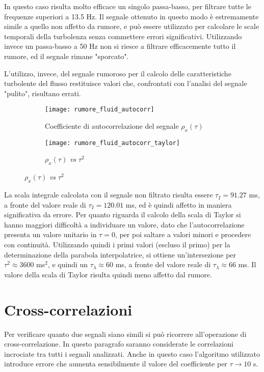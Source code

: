\documentclass{article} %
\begin{document}
In questo caso risulta molto efficace un singolo passa-basso, per filtrare tutte le frequenze superiori a 13.5 Hz. Il segnale ottenuto in questo modo è estremamente simile a quello non affetto da rumore, e può essere utilizzato per calcolare le scale temporali della turbolenza senza commettere errori significativi. Utilizzando invece un passa-basso a 50 Hz non si riesce a filtrare efficacemente tutto il rumore, ed il segnale rimane "sporcato".\par
L'utilizzo, invece, del segnale rumoroso per il calcolo delle caratteristiche turbolente del flusso restituisce valori che, confrontati con l'analisi del segnale "pulito", risultano errati.
\begin{figure}[h!]
	\begin{subfigure}{0.5\textwidth}
		\texttt{[image: rumore\_fluid\_autocorr]}
		\caption{Coefficiente di autocorrelazione del segnale $\rho_{x}(\tau)$}
	\end{subfigure}
	\begin{subfigure}{0.5\textwidth}
		\texttt{[image: rumore\_fluid\_autocorr\_taylor]}
		\caption{$\rho_{x}(\tau)$ \textit{vs} $\tau^2$}
	\end{subfigure}
\end{figure}\par
La scala integrale calcolata con il segnale non filtrato risulta essere $\tau_I = 91.27$ ms, a fronte del valore reale di $\tau_I = 120.01$ ms, ed è quindi affetto in maniera significativa da errore. Per quanto riguarda il calcolo della scala di Taylor si hanno maggiori difficoltà a individuare un valore, dato che l'autocorrelazione presenta un valore unitario in $\tau = 0$, per poi saltare a valori minori e procedere con continuità. Utilizzando quindi i primi valori (escluso il primo) per la determinazione della parabola interpolatrice, si ottiene un'intersezione per $\tau^2 \approx 3600$ ms$^2$, e quindi un $\tau_{\lambda} \approx 60$ ms, a fronte del valore reale di $\tau_{\lambda} \approx 66$ ms. Il valore della scala di Taylor risulta quindi meno affetto dal rumore.

\section{Cross-correlazioni}
Per verificare quanto due segnali siano simili si può ricorrere all'operazione di cross-correlazione. In questo paragrafo saranno considerate le correlazioni incrociate tra tutti i segnali analizzati. Anche in questo caso l'algoritmo utilizzato introduce errore che aumenta sensibilmente il valore del coefficiente per $\tau \to 10$ s.
\end{document}
